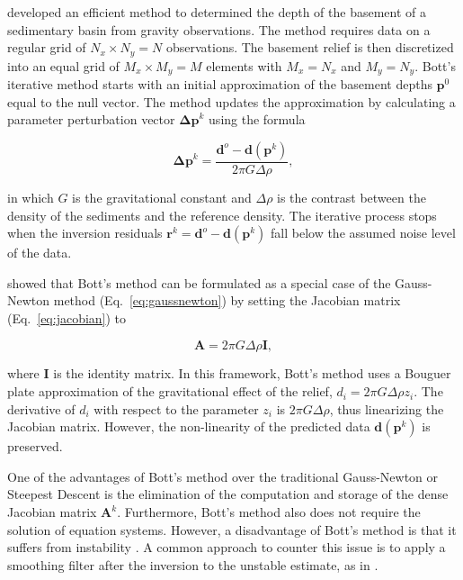 \documentclass[extra,mreferee]{gji}
\begin{document}
\citet{bott1960} developed an efficient method to determined the depth of the
basement of a sedimentary basin from gravity observations.
The method requires data on a regular grid of $N_x \times N_y = N$
observations.
The basement relief is then discretized into an equal grid of $M_x \times
M_y = M$ elements with $M_x = N_x$ and $M_y = N_y$.
Bott's iterative method starts with an initial approximation of the basement
depths $\mathbf{p}^0$ equal to the null vector.
The method updates the approximation by calculating a parameter perturbation
vector $\mathbf{\Delta p}^k$ using the formula

\begin{equation}
    \mathbf{\Delta p}^k =
        \dfrac{\mathbf{d}^o - \mathbf{d}(\mathbf{p}^k)}{2\pi G \Delta \rho},
    \label{eq:bott}
\end{equation}

\noindent
in which $G$ is the gravitational constant and $\Delta \rho$ is the
contrast between the density of the sediments and the reference density.
The iterative process stops when the inversion residuals
$\mathbf{r}^k = \mathbf{d}^o - \mathbf{d}(\mathbf{p}^k)$ fall below the assumed noise level
of the data.

\citet{silva2014} showed that Bott's method can be formulated as
a special case of the Gauss-Newton method (Eq.~\ref{eq:gaussnewton})
by setting the Jacobian matrix (Eq.~\ref{eq:jacobian}) to

\begin{equation}
    \mathbf{A} = 2\pi G \Delta \rho \mathbf{I},
    \label{eq:bott-gaussnewton}
\end{equation}

\noindent
where $\mathbf{I}$ is the identity matrix.
In this framework,
Bott's method uses a Bouguer plate approximation of the gravitational effect of
the relief, $d_i = 2\pi G \Delta\rho z_i$.
The derivative of $d_i$ with respect to the parameter $z_i$ is
$2\pi G \Delta \rho$, thus linearizing the Jacobian matrix.
However, the non-linearity of the predicted data $\mathbf{d}(\mathbf{p}^k)$ is
preserved.

One of the advantages of Bott's method over the traditional Gauss-Newton or
Steepest Descent is the elimination of the computation and storage of the dense
Jacobian matrix $\mathbf{A}^k$.
Furthermore, Bott's method also does not require the solution of equation
systems.
However, a disadvantage of Bott's method is that it suffers from instability
\citep{silva2014}.
A common approach to counter this issue is to apply a smoothing filter after
the inversion to the unstable estimate, as in \citet{silva2014}.
\end{document}
